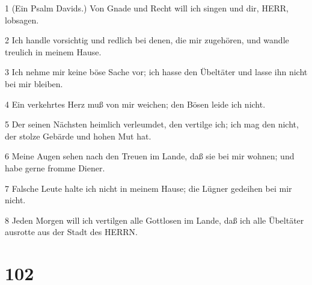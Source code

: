 \par 1 (Ein Psalm Davids.) Von Gnade und Recht will ich singen und dir, HERR, lobsagen.
\par 2 Ich handle vorsichtig und redlich bei denen, die mir zugehören, und wandle treulich in meinem Hause.
\par 3 Ich nehme mir keine böse Sache vor; ich hasse den Übeltäter und lasse ihn nicht bei mir bleiben.
\par 4 Ein verkehrtes Herz muß von mir weichen; den Bösen leide ich nicht.
\par 5 Der seinen Nächsten heimlich verleumdet, den vertilge ich; ich mag den nicht, der stolze Gebärde und hohen Mut hat.
\par 6 Meine Augen sehen nach den Treuen im Lande, daß sie bei mir wohnen; und habe gerne fromme Diener.
\par 7 Falsche Leute halte ich nicht in meinem Hause; die Lügner gedeihen bei mir nicht.
\par 8 Jeden Morgen will ich vertilgen alle Gottlosen im Lande, daß ich alle Übeltäter ausrotte aus der Stadt des HERRN.

\chapter{102}

